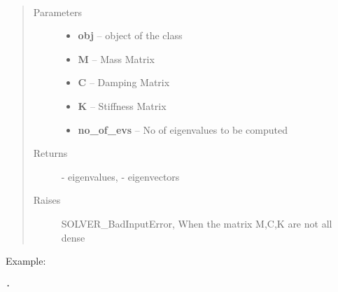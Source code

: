 \documentclass[letterpaper,10pt,english]{sphinxmanual}
\begin{document}
\begin{fulllineitems}
\label{index:brake.solve.solver.qev_dense}~\begin{quote}\begin{description}
\item[{Parameters}] \leavevmode\begin{itemize}
\item {} 
\textbf{obj} -- object of the class 

\item {} 
\textbf{M} -- Mass Matrix

\item {} 
\textbf{C} -- Damping Matrix

\item {} 
\textbf{K} -- Stiffness Matrix

\item {} 
\textbf{no\_of\_evs} -- No of eigenvalues to be computed

\end{itemize}

\item[{Returns}] \leavevmode
{} - eigenvalues,  - eigenvectors

\item[{Raises }] \leavevmode
SOLVER\_BadInputError, When the matrix M,C,K are not all dense

\end{description}\end{quote}

Example:

\begin{Verbatim}[commandchars=\\\{\}]
.
\end{Verbatim}

\end{fulllineitems}

\end{document}
